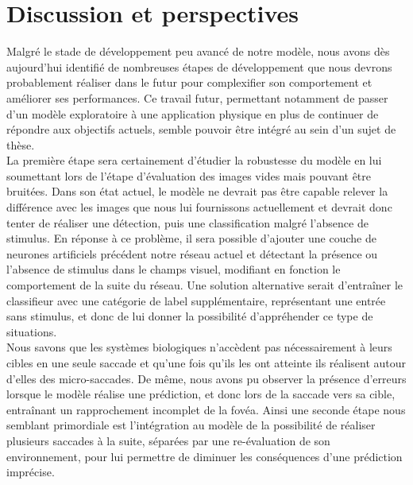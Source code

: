 
\chapter{Discussion et perspectives} %

\label{Discussion} %


Malgré le stade de développement peu avancé de notre modèle, nous avons dès aujourd'hui identifié de nombreuses étapes de développement que nous devrons probablement réaliser dans le futur pour complexifier son comportement et améliorer ses performances. 
Ce travail futur, permettant notamment de passer d'un modèle exploratoire à une application physique en plus de continuer de répondre aux objectifs actuels, semble pouvoir être intégré au sein d'un sujet de thèse.\\
La première étape sera certainement d'étudier la robustesse du modèle en lui soumettant lors de l'étape d'évaluation des images vides mais pouvant être bruitées.
Dans son état actuel, le modèle ne devrait pas être capable relever la différence avec les images que nous lui fournissons actuellement et devrait donc tenter de réaliser une détection, puis une classification malgré l'absence de stimulus.
En réponse à ce problème, il sera possible d'ajouter une couche de neurones artificiels précédent notre réseau actuel et détectant la présence ou l'absence de stimulus dans le champs visuel, modifiant en fonction le comportement de la suite du réseau. 
Une solution alternative serait d'entraîner le classifieur avec une catégorie de label supplémentaire, représentant une entrée sans stimulus, et donc de lui donner la possibilité d'appréhender ce type de situations. \\
Nous savons que les systèmes biologiques n'accèdent pas nécessairement à leurs cibles en une seule saccade et qu'une fois qu'ils les ont atteinte ils réalisent autour d'elles des micro-saccades.
De même, nous avons pu observer la présence d'erreurs lorsque le modèle réalise une prédiction, et donc lors de la saccade vers sa cible, entraînant un rapprochement incomplet de la fovéa.
Ainsi une seconde étape nous semblant primordiale est l'intégration au modèle de la possibilité de réaliser plusieurs saccades à la suite, séparées par une re-évaluation de son environnement, pour lui permettre de diminuer les conséquences d'une prédiction imprécise. \autocite{Najemnik2005, Werner2014}\\
